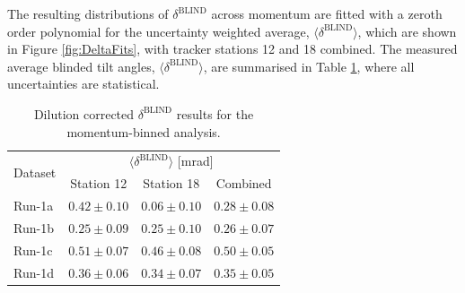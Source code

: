 




The resulting distributions of $\delta^{\text{BLIND}}$ across momentum are fitted with a zeroth order polynomial for the uncertainty weighted average, $\langle \delta^{\text{BLIND}} \rangle$, which are shown in Figure \ref{fig:DeltaFits}, with tracker stations 12 and 18 combined. The measured average blinded tilt angles, $\langle\delta^{\text{BLIND}}\rangle$, are summarised in Table \ref{tbl:Run1MomBinnedTiltAngles}, where all uncertainties are statistical.%

\begin{table}[t!]
\centering{}
\begin{tabular}{l|ccc}
\hline
\hline
\multirow{2}{*}{Dataset} & \multicolumn{3}{c}{$\langle\delta^{\text{BLIND}}\rangle$ [mrad]} \\ \cline{2-4}
& Station 12 & Station 18 & Combined \\ %
\hline
Run-1a &  $0.42\pm0.10$ & $0.06\pm0.10$ & $0.28\pm0.08$\\
Run-1b &  $0.25\pm0.09$ & $0.25\pm0.10$ & $0.26\pm0.07$\\
Run-1c &  $0.51\pm0.07$ & $0.46\pm0.08$ & $0.50\pm0.05$\\ 
Run-1d &  $0.36\pm0.06$ & $0.34\pm0.07$ & $0.35\pm0.05$\\ 
\hline
\hline
\end{tabular}
\caption{Dilution corrected $\delta^{\text{BLIND}}$ results for the momentum-binned analysis.} 
\label{tbl:Run1MomBinnedTiltAngles}
\end{table}


